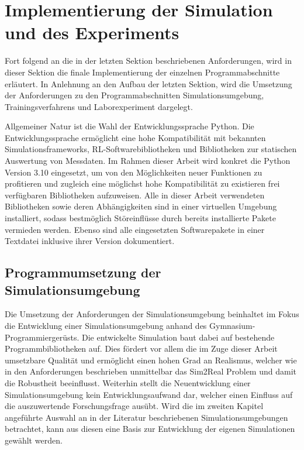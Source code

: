 \section{Implementierung der Simulation und des Experiments}

Fort folgend an die in der letzten Sektion beschriebenen Anforderungen, wird in dieser Sektion die finale Implementierung der einzelnen Programmabschnitte erläutert.
In Anlehnung an den Aufbau der letzten Sektion, wird die Umsetzung der Anforderungen zu den Programmabschnitten Simulationsumgebung, Trainingsverfahrens und Laborexperiment dargelegt.

Allgemeiner Natur ist die Wahl der Entwicklungssprache Python.
Die Entwicklungssprache ermöglicht eine hohe Kompatibilität mit bekannten Simulationsframeworks, RL-Softwarebibliotheken und Bibliotheken zur statischen Auswertung von Messdaten.
Im Rahmen dieser Arbeit wird konkret die Python Version 3.10 eingesetzt, um von den Möglichkeiten neuer Funktionen zu profitieren und zugleich eine möglichst hohe Kompatibilität zu existieren frei verfügbaren Bibliotheken aufzuweisen.
Alle in dieser Arbeit verwendeten Bibliotheken sowie deren Abhängigkeiten sind in einer virtuellen Umgebung installiert, sodass bestmöglich Störeinflüsse durch bereits installierte Pakete vermieden werden.
Ebenso sind alle eingesetzten Softwarepakete in einer Textdatei inklusive ihrer Version dokumentiert.

\subsection{Programmumsetzung der Simulationsumgebung}

Die Umsetzung der Anforderungen der Simulationsumgebung beinhaltet im Fokus die Entwicklung einer Simulationsumgebung anhand des Gymnasium-Programmiergerüsts.
Die entwickelte Simulation baut dabei auf bestehende Programmbibliotheken auf.
Dies fördert vor allem die im Zuge dieser Arbeit umsetzbare Qualität und ermöglicht einen hohen Grad an Realismus, welcher wie in den Anforderungen beschrieben unmittelbar das Sim2Real Problem und damit die Robustheit beeinflusst.
Weiterhin stellt die Neuentwicklung einer Simulationsumgebung kein Entwicklungsaufwand dar, welcher einen Einfluss auf die auszuwertende Forschungsfrage ausübt.
Wird die im zweiten Kapitel angeführte Auswahl an in der Literatur beschriebenen Simulationsumgebungen betrachtet, kann aus diesen eine Basis zur Entwicklung der eigenen Simulationen gewählt werden.

